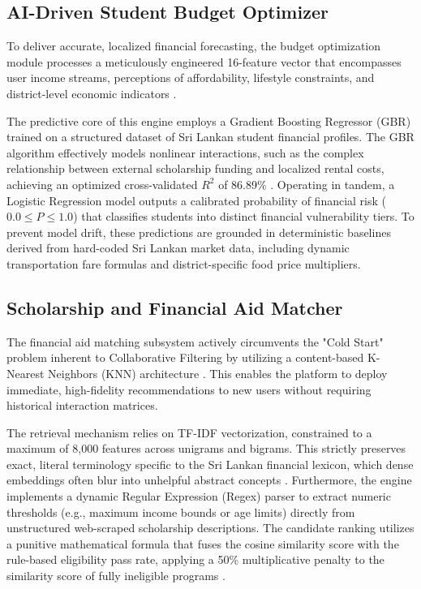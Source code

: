 \documentclass[conference]{IEEEtran}
\begin{document}
\subsection{AI-Driven Student Budget Optimizer}
To deliver accurate, localized financial forecasting, the budget optimization module processes a meticulously engineered 16-feature vector that encompasses user income streams, perceptions of affordability, lifestyle constraints, and district-level economic indicators \cite{sljssh2021online}.

The predictive core of this engine employs a Gradient Boosting Regressor (GBR) trained on a structured dataset of Sri Lankan student financial profiles. The GBR algorithm effectively models nonlinear interactions, such as the complex relationship between external scholarship funding and localized rental costs, achieving an optimized cross-validated $R^2$ of 86.89\% \cite{li2024dynamic}. Operating in tandem, a Logistic Regression model outputs a calibrated probability of financial risk ($0.0 \le P \le 1.0$) that classifies students into distinct financial vulnerability tiers. To prevent model drift, these predictions are grounded in deterministic baselines derived from hard-coded Sri Lankan market data, including dynamic transportation fare formulas and district-specific food price multipliers.

\subsection{Scholarship and Financial Aid Matcher}
The financial aid matching subsystem actively circumvents the "Cold Start" problem inherent to Collaborative Filtering by utilizing a content-based K-Nearest Neighbors (KNN) architecture \cite{tarus2018matrix, bakhshinategh2023course}. This enables the platform to deploy immediate, high-fidelity recommendations to new users without requiring historical interaction matrices.

The retrieval mechanism relies on TF-IDF vectorization, constrained to a maximum of 8,000 features across unigrams and bigrams. This strictly preserves exact, literal terminology specific to the Sri Lankan financial lexicon, which dense embeddings often blur into unhelpful abstract concepts \cite{silva2026systematic}. Furthermore, the engine implements a dynamic Regular Expression (Regex) parser to extract numeric thresholds (e.g., maximum income bounds or age limits) directly from unstructured web-scraped scholarship descriptions. The candidate ranking utilizes a punitive mathematical formula that fuses the cosine similarity score with the rule-based eligibility pass rate, applying a 50\% multiplicative penalty to the similarity score of fully ineligible programs \cite{seu2024stream}.
\end{document}
